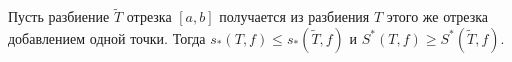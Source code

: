 \label{Razbmi}
 	Пусть разбиение $\widetilde T$ отрезка $[a,b]$ получается из разбиения
 	$T$ этого же отрезка добавлением одной точки.
 	Тогда $s_*(T,f)\leq s_*(\widetilde T,f)$ и 
 	$S^*(T,f)\geq S^*(\widetilde T,f)$.
 